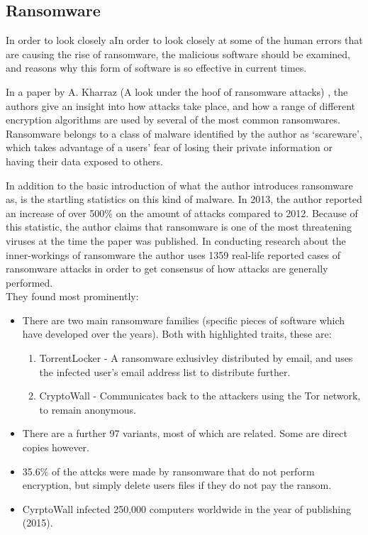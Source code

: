 \documentclass[journal,comsoc]{IEEEtran}
\begin{document}
\subsection{Ransomware}
In order to look closely aIn order to look closely at some of the human errors that are causing the rise of ransomware, the malicious software should be examined, and reasons why this form of software is so effective in current times. \par
In a paper by A. Kharraz (A look under the hoof of ransomware attacks) \cite{4}, the authors give an insight into how attacks take place, and how a range of different encryption algorithms are used by several of the most common ransomwares. Ransomware belongs to a class of malware identified by the author as ‘scareware’, which takes advantage of a users’ fear of losing their private information or having their data exposed to others. \par
In addition to the basic introduction of what the author introduces ransomware as, is the startling statistics on this kind of malware. In 2013, the author reported an increase of over 500\% on the amount of attacks compared to 2012. Because of this statistic, the author claims that ransomware is one of the most threatening viruses at the time the paper was published. In conducting research about the inner-workings of ransomware the author uses 1359 real-life reported cases of ransomware attacks in order to get consensus of how attacks are generally performed. \\
They found most prominently:
\begin{itemize}
\item There are two main ransomware families (specific pieces of software which have developed over the years). Both with highlighted traits, these are:
\begin{enumerate}
\item TorrentLocker - A ransomware exlusivley distributed by email, and uses the infected user’s email address list to distribute further.
\item CryptoWall - Communicates back to the attackers using the Tor network, to remain anonymous.
\end{enumerate}
\item There are a further 97 variants, most of which are related. Some are direct copies however.
\item 35.6\% of the attcks were made by ransomware that do not perform encryption, but simply delete users files if they do not pay the ransom.
\item CyrptoWall infected 250,000 computers worldwide in the year of publishing (2015).
\end{itemize}
\end{document}
